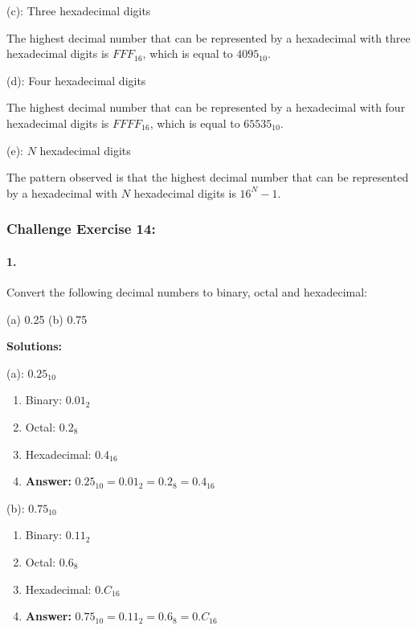 \documentclass{article}
\begin{document}
\noindent (c): Three hexadecimal digits

\vspace*{0.25cm}

\noindent The highest decimal number that can be represented by a hexadecimal with three hexadecimal digits is $FFF_{16}$, which is equal to $4095_{10}$.

\newpage

\noindent (d): Four hexadecimal digits

\vspace*{0.25cm}

\noindent The highest decimal number that can be represented by a hexadecimal with four hexadecimal digits is $FFFF_{16}$, which is equal to $65535_{10}$.

\vspace*{0.5cm}

\noindent (e): $N$ hexadecimal digits

\vspace*{0.25cm}

\noindent The pattern observed is that the highest decimal number that can be represented by a hexadecimal with $N$ hexadecimal digits is $16^N - 1$.

\subsubsection {Challenge Exercise 14:}

\paragraph*{1.}

Convert the following decimal numbers to binary, octal and hexadecimal:

(a) 0.25 (b) 0.75

\vspace*{0.5cm}

\noindent \textbf{Solutions:}

\vspace*{0.25cm}

\noindent (a): $0.25_{10}$

\begin{enumerate}
    \item Binary: $0.01_2$
    \item Octal: $0.2_8$
    \item Hexadecimal: $0.4_{16}$
    \item \textbf{Answer:} $0.25_{10} = 0.01_2 = 0.2_8 = 0.4_{16}$
\end{enumerate}

\vspace*{0.5cm}

\noindent (b): $0.75_{10}$

\begin{enumerate}
    \item Binary: $0.11_2$
    \item Octal: $0.6_8$
    \item Hexadecimal: $0.C_{16}$
    \item \textbf{Answer:} $0.75_{10} = 0.11_2 = 0.6_8 = 0.C_{16}$
\end{enumerate}
\end{document}
